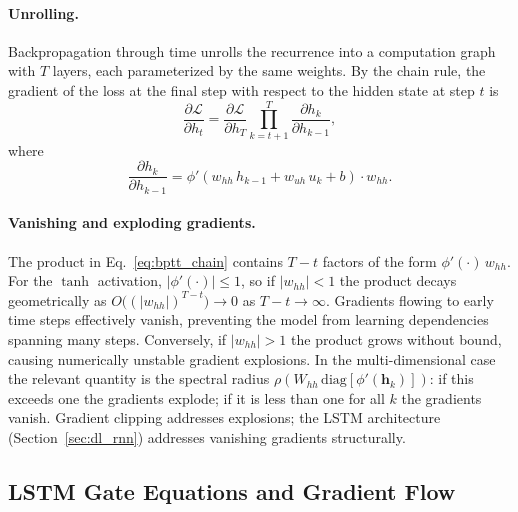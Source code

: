 \paragraph{Unrolling.}
Backpropagation through time unrolls the recurrence into a computation graph
with $T$ layers, each parameterized by the same weights.  By the chain rule,
the gradient of the loss at the final step with respect to the hidden state at
step $t$ is
\begin{equation}\label{eq:bptt_chain}
  \frac{\partial \mathcal{L}}{\partial h_t}
    = \frac{\partial \mathcal{L}}{\partial h_T}
      \prod_{k=t+1}^{T} \frac{\partial h_k}{\partial h_{k-1}},
\end{equation}
where
\begin{equation}\label{eq:bptt_local}
  \frac{\partial h_k}{\partial h_{k-1}}
    = \phi'\!\left(w_{hh}\,h_{k-1} + w_{uh}\,u_k + b\right)\cdot w_{hh}.
\end{equation}

\paragraph{Vanishing and exploding gradients.}
The product in Eq.~\eqref{eq:bptt_chain} contains $T - t$ factors of the form
$\phi'(\cdot)\,w_{hh}$.  For the $\tanh$ activation,
$|\phi'(\cdot)| \leq 1$, so if $|w_{hh}| < 1$ the product decays
geometrically as $O\bigl((|w_{hh}|)^{T-t}\bigr) \to 0$ as $T - t \to \infty$.
Gradients flowing to early time steps effectively vanish, preventing the model
from learning dependencies spanning many steps.  Conversely, if $|w_{hh}| > 1$
the product grows without bound, causing numerically unstable gradient
explosions.  In the multi-dimensional case the relevant quantity is the spectral
radius $\rho(W_{hh} \,\mathrm{diag}[\phi'(\mathbf{h}_k)])$: if this exceeds
one the gradients explode; if it is less than one for all $k$ the gradients
vanish.  Gradient clipping addresses explosions; the LSTM architecture
(Section~\ref{sec:dl_rnn}) addresses vanishing gradients structurally.

\subsection{LSTM Gate Equations and Gradient Flow}
\label{sec:lstm_derivation}

